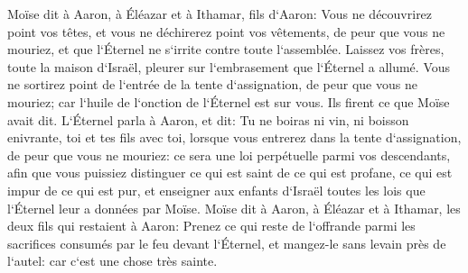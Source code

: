 \verse Moïse dit à Aaron, à Éléazar et à Ithamar, fils d`Aaron: Vous ne découvrirez point vos têtes, et vous ne déchirerez point vos vêtements, de peur que vous ne mouriez, et que l`Éternel ne s`irrite contre toute l`assemblée. Laissez vos frères, toute la maison d`Israël, pleurer sur l`embrasement que l`Éternel a allumé. 
\verse Vous ne sortirez point de l`entrée de la tente d`assignation, de peur que vous ne mouriez; car l`huile de l`onction de l`Éternel est sur vous. Ils firent ce que Moïse avait dit. 
\verse L`Éternel parla à Aaron, et dit: 
\verse Tu ne boiras ni vin, ni boisson enivrante, toi et tes fils avec toi, lorsque vous entrerez dans la tente d`assignation, de peur que vous ne mouriez: ce sera une loi perpétuelle parmi vos descendants, 
\verse afin que vous puissiez distinguer ce qui est saint de ce qui est profane, ce qui est impur de ce qui est pur, 
\verse et enseigner aux enfants d`Israël toutes les lois que l`Éternel leur a données par Moïse. 
\verse Moïse dit à Aaron, à Éléazar et à Ithamar, les deux fils qui restaient à Aaron: Prenez ce qui reste de l`offrande parmi les sacrifices consumés par le feu devant l`Éternel, et mangez-le sans levain près de l`autel: car c`est une chose très sainte. 
